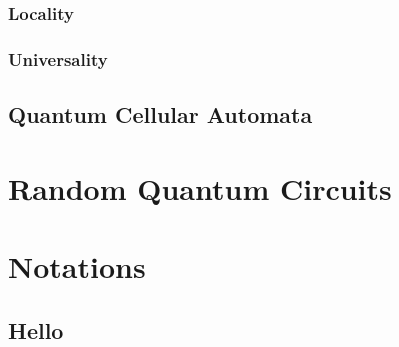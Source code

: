 \documentclass[11pt, oneside]{scrbook}
\begin{document}
\subsection{Locality} \label{ssec: locality}

\subsection{Universality} \label{ssec: universality}
\lipsum[3]

\section{Quantum Cellular Automata}
\lipsum[5-15]


\chapter{Random Quantum Circuits}

\appendix
\chapter{Notations}
\section{Hello}

\backmatter
\printbibliography[heading=bibintoc, title=Bibliography]
\end{document}
